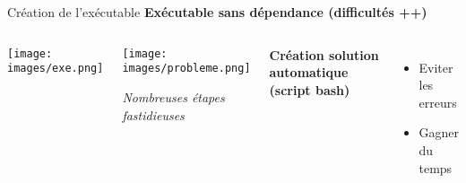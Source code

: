 \begin{frame}{Création de l'exécutable}
    \vspace*{-0.3cm}
    \textbf{Exécutable sans dépendance (difficultés ++)}
    \begin{columns}
        \vspace*{-0.5cm}
        \begin{center}
            \texttt{[image: images/exe.png]}
        \end{center}

        \begin{center}
            \texttt{[image: images/probleme.png]}
            
            \emph{Nombreuses étapes fastidieuses}
        \end{center}
        \vspace{0.3cm}
        
        
        \textbf{Création solution automatique (script bash)} 
        \begin{itemize}
            \item Eviter les erreurs
            \item Gagner du temps
        \end{itemize}
    \end{columns}
    

    
\end{frame}

